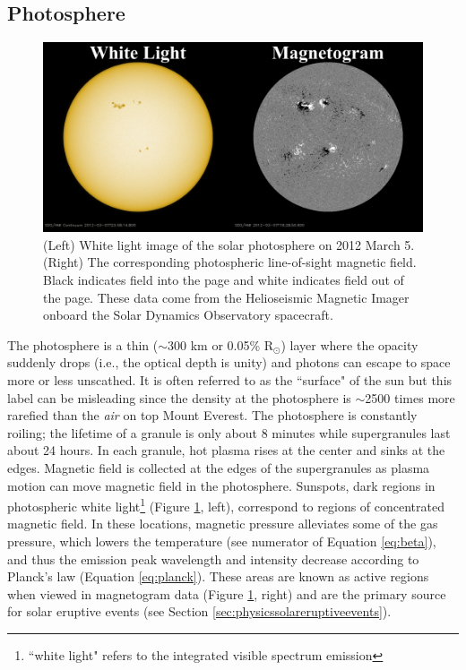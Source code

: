 \subsection{Photosphere}

\begin{figure}[!h]
    \begin{center}
	    \includegraphics[width=\textwidth]{Images/WhiteLightAndMagnetogram.png}
    \end{center}
    \caption[Sunspots and Active Regions]{
        (Left) White light image of the solar photosphere on 2012 March 5. (Right) The corresponding photospheric 
        line-of-sight magnetic field. Black indicates field into the page and white indicates field out of the page. 
        These data come from the Helioseismic Magnetic Imager onboard the Solar Dynamics Observatory spacecraft. 
    }
    \label{fig:sunspotsandars}
\end{figure}

The photosphere is a thin ($\sim$300 km or 0.05\% R$_\odot$) layer where the opacity suddenly drops (i.e., the optical depth is unity) and photons can escape to space more or less unscathed. It is often referred to as the ``surface" of the sun but this label can be misleading since the density at the photosphere is $\sim$2500 times more rarefied than the \textit{air} on top Mount Everest. The photosphere is constantly roiling; the lifetime of a granule is only about 8 minutes while supergranules last about 24 hours. In each granule, hot plasma rises at the center and sinks at the edges. Magnetic field is collected at the edges of the supergranules as plasma motion can move magnetic field in the photosphere. Sunspots, dark regions in photospheric white light\footnote{``white light" refers to the integrated visible spectrum emission} (Figure \ref{fig:sunspotsandars}, left), correspond to regions of concentrated magnetic field. In these locations, magnetic pressure alleviates some of the gas pressure, which lowers the temperature (see numerator of Equation \ref{eq:beta}), and thus the emission peak wavelength and intensity decrease according to Planck's law (Equation \ref{eq:planck}). These areas are known as active regions when viewed in magnetogram data (Figure \ref{fig:sunspotsandars}, right) and are the primary source for solar eruptive events (see Section \ref{sec:physicssolareruptiveevents}). 

